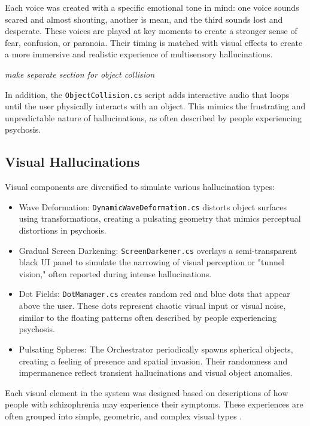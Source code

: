 Each voice was created with a specific emotional tone in mind: one voice sounds scared and almost shouting, another is mean, and the third sounds lost and desperate. These voices are played at key moments to create a stronger sense of fear, confusion, or paranoia. Their timing is matched with visual effects to create a more immersive and realistic experience of multisensory hallucinations.

\emph{make separate section for object collision}
    
In addition, the \texttt{ObjectCollision.cs} script adds interactive audio that loops until the user physically interacts with an object. This mimics the frustrating and unpredictable nature of hallucinations, as often described by people experiencing psychosis.
    
    
\subsection{Visual Hallucinations}
Visual components are diversified to simulate various hallucination types:
\begin{itemize}
    \item Wave Deformation: \texttt{DynamicWaveDeformation.cs} distorts object surfaces using transformations, creating a pulsating geometry that mimics perceptual distortions in psychosis.
    \item Gradual Screen Darkening: \texttt{ScreenDarkener.cs} overlays a semi-transparent black UI panel to simulate the narrowing of visual perception or "tunnel vision," often reported during intense hallucinations.
    \item Dot Fields: \texttt{DotManager.cs} creates random red and blue dots that appear above the user. These dots represent chaotic visual input or visual noise, similar to the floating patterns often described by people experiencing psychosis.
    \item Pulsating Spheres: The Orchestrator periodically spawns spherical objects, creating a feeling of presence and spatial invasion. Their randomness and impermanence reflect transient hallucinations and visual object anomalies.
\end{itemize}

Each visual element in the system was designed based on descriptions of how people with schizophrenia may experience their symptoms. These experiences are often grouped into simple, geometric, and complex visual types \cite{Silverstein2021,Vanommen2019}.

